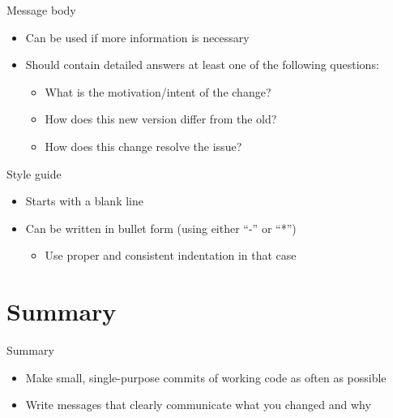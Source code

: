 \begin{frame}
\begin{block}{Message body}
  \begin{itemize}
      \item Can be used if more information is necessary
      \item Should contain detailed answers at least one of the following questions:
      \begin{itemize}
          \item What is the motivation/intent of the change?
          \item How does this new version differ from the old?
          \item How does this change resolve the issue?
      \end{itemize}
  \end{itemize}
\end{block}
\begin{block}{Style guide}
  \begin{itemize}
    \item Starts with a blank line
    \item Can be written in bullet form (using either \enquote{-} or \enquote{*})
    \begin{itemize}
        \item Use proper and consistent indentation in that case
    \end{itemize}
  \end{itemize}
\end{block}
\end{frame}

\section{Summary}
\begin{frame}
\begin{block}{Summary}
\begin{itemize}
    \item Make small, single-purpose commits of working code as often as possible
    \item Write messages that clearly communicate what you changed and why
\end{itemize}
    
\end{block}
    
\end{frame}